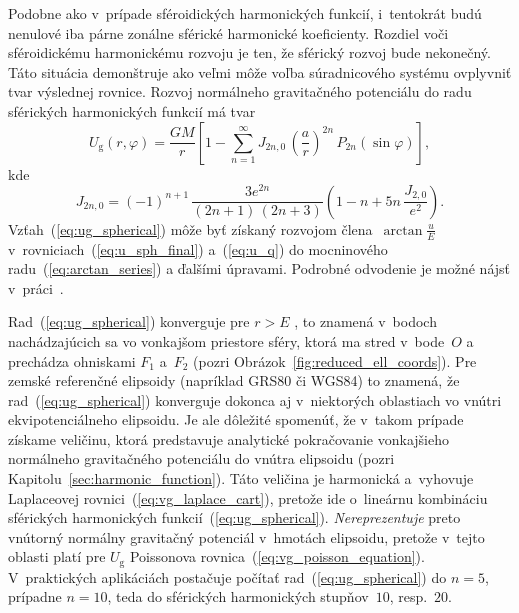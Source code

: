 \documentclass[a4paper,12pt]{book}
\newcommand{\gidx}{\mathrm g}
\begin{document}
Podobne ako v~prípade sféroidických harmonických funkcií, i~tentokrát budú 
nenulové iba párne zonálne sférické harmonické koeficienty.  Rozdiel voči 
sféroidickému harmonickému rozvoju je ten, že sférický rozvoj bude nekonečný.  
Táto situácia demonštruje ako veľmi môže voľba súradnicového systému ovplyvniť 
tvar výslednej rovnice.  Rozvoj normálneho gravitačného potenciálu do radu 
sférických harmonických funkcií má tvar \parencite{Moritz1967}
%
\begin{equation}
\label{eq:ug_spherical}
U_\gidx(r, \varphi) = \frac{GM}{r} \left[ 1 - \sum_{n = 1}^{\infty} J_{2n,0} \, 
\left( \frac{a}{r} \right)^{2n} \, P_{2n}(\sin\varphi) \right]{,}
\end{equation}
%
kde
%
\begin{equation}
J_{2n,0} = (-1)^{n + 1} \, \frac{3e^{2n}}{(2n + 1) \, (2n + 3)} \left( 
1 - n + 5n \, \frac{J_{2,0}}{e^2} \right){.}
\end{equation}
%
Vzťah~(\ref{eq:ug_spherical}) môže byť získaný rozvojom 
člena~$\arctan\frac{u}{E}$ v~rovniciach~(\ref{eq:u_sph_final}) a~(\ref{eq:u_q}) 
do mocninového radu~(\ref{eq:arctan_series}) a ďalšími úpravami.  Podrobné 
odvodenie je možné nájsť v~práci~\textcite{Moritz1967}.

Rad~(\ref{eq:ug_spherical}) konverguje pre $r > E$ 
\parencite{MoritzAdvancedGeodesy}, to znamená v~bodoch nachádzajúcich sa vo 
vonkajšom priestore sféry, ktorá ma stred v~bode~$O$ a prechádza ohniskami 
$F_1$ a~$F_2$ (pozri Obrázok~\ref{fig:reduced_ell_coords}).  Pre zemské 
referenčné elipsoidy (napríklad GRS80 či WGS84) to znamená, že 
rad~(\ref{eq:ug_spherical}) konverguje dokonca aj v~niektorých oblastiach vo 
vnútri ekvipotenciálneho elipsoidu.  Je ale dôležité spomenúť, že v~takom 
prípade získame veličinu, ktorá predstavuje analytické pokračovanie vonkajšieho 
normálneho gravitačného potenciálu do vnútra elipsoidu (pozri 
Kapitolu~\ref{sec:harmonic_function}).  Táto veličina je harmonická a~vyhovuje 
Laplaceovej rovnici~(\ref{eq:vg_laplace_cart}), pretože ide o~lineárnu 
kombináciu sférických harmonických funkcií~(\ref{eq:ug_spherical}).  
\emph{Nereprezentuje} preto vnútorný normálny gravitačný potenciál v~hmotách 
elipsoidu, pretože v~tejto oblasti platí pre $U_\gidx$ Poissonova 
rovnica~(\ref{eq:vg_poisson_equation}).  V~praktických aplikáciách postačuje 
počítať rad~(\ref{eq:ug_spherical}) do $n = 5$, prípadne $n = 10$, teda do 
sférických harmonických stupňov~$10$, resp.~$20$.
\end{document}
